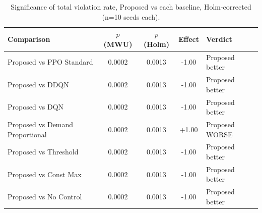 \begin{table}[t]
\centering
\caption{Significance of total violation rate, Proposed vs each baseline, Holm-corrected (n=10 seeds each).}
\label{tab:stats}
\begin{tabular}{lcccl}
\toprule
Comparison & $p$ (MWU) & $p$ (Holm) & Effect & Verdict \\
\midrule
Proposed vs PPO Standard & 0.0002 & 0.0013 & -1.00 & Proposed better \\
Proposed vs DDQN & 0.0002 & 0.0013 & -1.00 & Proposed better \\
Proposed vs DQN & 0.0002 & 0.0013 & -1.00 & Proposed better \\
Proposed vs Demand Proportional & 0.0002 & 0.0013 & +1.00 & Proposed WORSE \\
Proposed vs Threshold & 0.0002 & 0.0013 & -1.00 & Proposed better \\
Proposed vs Const Max & 0.0002 & 0.0013 & -1.00 & Proposed better \\
Proposed vs No Control & 0.0002 & 0.0013 & -1.00 & Proposed better \\
\bottomrule
\end{tabular}
\end{table}